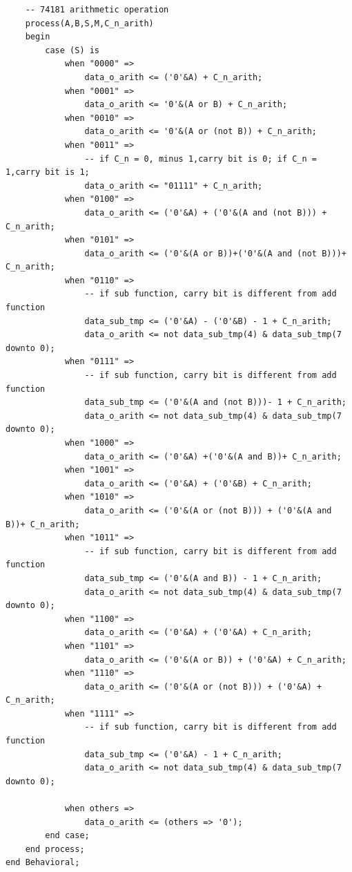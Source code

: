 \documentclass[a4paper]{ctexart}
\begin{document}
\begin{lstlisting}
	-- 74181 arithmetic operation
	process(A,B,S,M,C_n_arith)
	begin
		case (S) is 
			when "0000" =>
				data_o_arith <= ('0'&A) + C_n_arith;
			when "0001" =>
				data_o_arith <= '0'&(A or B) + C_n_arith;
			when "0010" =>
				data_o_arith <= '0'&(A or (not B)) + C_n_arith;
			when "0011" =>
				-- if C_n = 0, minus 1,carry bit is 0; if C_n = 1,carry bit is 1;
				data_o_arith <= "01111" + C_n_arith; 
			when "0100" =>
				data_o_arith <= ('0'&A) + ('0'&(A and (not B))) + C_n_arith;
			when "0101" =>
				data_o_arith <= ('0'&(A or B))+('0'&(A and (not B)))+ C_n_arith;
			when "0110" =>
				-- if sub function, carry bit is different from add function
				data_sub_tmp <= ('0'&A) - ('0'&B) - 1 + C_n_arith;
				data_o_arith <= not data_sub_tmp(4) & data_sub_tmp(7 downto 0);
			when "0111" =>
				-- if sub function, carry bit is different from add function
				data_sub_tmp <= ('0'&(A and (not B)))- 1 + C_n_arith;
				data_o_arith <= not data_sub_tmp(4) & data_sub_tmp(7 downto 0);
			when "1000" =>
				data_o_arith <= ('0'&A) +('0'&(A and B))+ C_n_arith;
			when "1001" =>
				data_o_arith <= ('0'&A) + ('0'&B) + C_n_arith;
			when "1010" =>
				data_o_arith <= ('0'&(A or (not B))) + ('0'&(A and B))+ C_n_arith;
			when "1011" =>
				-- if sub function, carry bit is different from add function
				data_sub_tmp <= ('0'&(A and B)) - 1 + C_n_arith;
				data_o_arith <= not data_sub_tmp(4) & data_sub_tmp(7 downto 0);
			when "1100" =>
				data_o_arith <= ('0'&A) + ('0'&A) + C_n_arith;
			when "1101" =>
				data_o_arith <= ('0'&(A or B)) + ('0'&A) + C_n_arith;
			when "1110" =>
				data_o_arith <= ('0'&(A or (not B))) + ('0'&A) + C_n_arith;
			when "1111" =>
				-- if sub function, carry bit is different from add function
				data_sub_tmp <= ('0'&A) - 1 + C_n_arith;
				data_o_arith <= not data_sub_tmp(4) & data_sub_tmp(7 downto 0);
		
			when others =>
				data_o_arith <= (others => '0');
		end case;
	end process;
end Behavioral;	
\end{lstlisting}

\newpage
\end{document}
